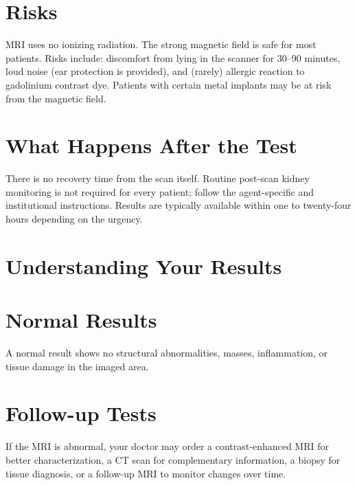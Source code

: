 \section*{Risks}
MRI uses no ionizing radiation. The strong magnetic field is safe for most patients. Risks include: discomfort from lying in the scanner for 30--90 minutes, loud noise (ear protection is provided), and (rarely) allergic reaction to gadolinium contrast dye. Patients with certain metal implants may be at risk from the magnetic field.

\section*{What Happens After the Test}
There is no recovery time from the scan itself. Routine post-scan kidney monitoring is not required for every patient; follow the agent-specific and institutional instructions. Results are typically available within one to twenty-four hours depending on the urgency.

\section*{Understanding Your Results}

\section*{Normal Results}
A normal result shows no structural abnormalities, masses, inflammation, or tissue damage in the imaged area.

\section*{Follow-up Tests}
If the MRI is abnormal, your doctor may order a contrast-enhanced MRI for better characterization, a CT scan for complementary information, a biopsy for tissue diagnosis, or a follow-up MRI to monitor changes over time.
\clearpage
